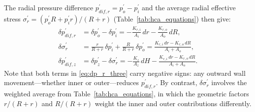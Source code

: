 \documentclass[a4paper,fleqn]{cas-sc}
\begin{document}
The radial pressure difference $p_{dif,r}^{\prime}=p_o^{\prime}-p_i^{\prime}$ and the average radial effective stress $\sigma_r^{\prime}=({p_o^{\prime}R+p_i^{\prime}r})/({R+r})$ (Table~\ref{tab:hca_equations}) then give:
\begin{align}
\delta p_{dif,r}^{\prime}
  &= \delta p_o^{\prime}-\delta p_i^{\prime}
   = -\frac{K_{r,i}}{A_i}\,dr - \frac{K_{r,o}}{A_o}\,dR, \label{eq:dp_r_three}\\[6pt]
\delta\sigma_r^{\prime}
  &= \frac{r}{R+r}\,\delta p_i^{\prime} + \frac{R}{R+r}\,\delta p_o^{\prime}
   = \frac{K_{r,i}\,dr - K_{r,o}\,dR}{A_i+A_o}, \label{eq:dsigma_r_three}\\[6pt]
\delta p_{dif,z}^{\prime}
  &= \delta p_z^{\prime}-\delta\sigma_r^{\prime}
   = -\frac{K_z}{A_z}\,dH - \frac{K_{r,i}\,dr - K_{r,o}\,dR}{A_i+A_o}. \label{eq:dp_z_three}
\end{align}
Note that both terms in \cref{eq:dp_r_three} carry negative signs: any outward wall movement---whether inner or outer---reduces $p_{dif,r}^{\prime}$. By contrast, $\delta\sigma_r^{\prime}$ involves the weighted average from Table~\ref{tab:hca_equations}, in which the geometric factors $r/(R+r)$ and $R/(R+r)$ weight the inner and outer contributions differently.
\end{document}
